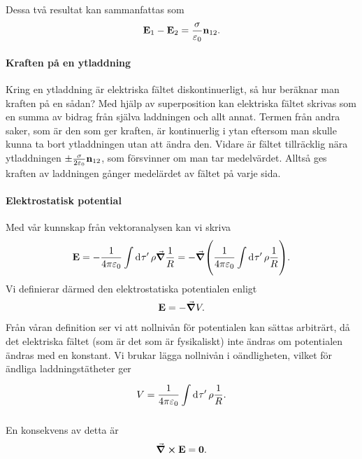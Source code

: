 Dessa två resultat kan sammanfattas som
\begin{align*}
	\vb{E}_{1} - \vb{E}_{2} = \frac{\sigma}{\varepsilon_{0}}\vb{n}_{12}.
\end{align*}

\paragraph{Kraften på en ytladdning}
Kring en ytladdning är elektriska fältet diskontinuerligt, så hur beräknar man kraften på en sådan? Med hjälp av superposition kan elektriska fältet skrivas som en summa av bidrag från själva laddningen och allt annat. Termen från andra saker, som är den som ger kraften, är kontinuerlig i ytan eftersom man skulle kunna ta bort ytladdningen utan att ändra den. Vidare är fältet tillräcklig nära ytladdningen $\pm\frac{\sigma}{2\varepsilon_{0}}\vb{n}_{12}$, som försvinner om man tar medelvärdet. Alltså ges kraften av laddningen gånger medelärdet av fältet på varje sida.

\paragraph{Elektrostatisk potential}
Med vår kunnskap från vektoranalysen kan vi skriva
\begin{align*}
	\vb{E} = -\frac{1}{4\pi\varepsilon_{0}}\int\limits_{}^{}\dd[]{\tau'}\rho\grad{\frac{1}{R}} = -\grad(\frac{1}{4\pi\varepsilon_{0}}\int\limits_{}^{}\dd[]{\tau'}\rho\frac{1}{R}).
\end{align*}
Vi definierar därmed den elektrostatiska potentialen enligt
\begin{align*}
	\vb{E} = -\grad{V}.
\end{align*}
Från våran definition ser vi att nollnivån för potentialen kan sättas arbiträrt, då det elektriska fältet (som är det som är fysikaliskt) inte ändras om potentialen ändras med en konstant. Vi brukar lägga nollnivån i oändligheten, vilket för ändliga laddningstätheter ger
\begin{align*}
	V = \frac{1}{4\pi\varepsilon_{0}}\int\limits_{}^{}\dd[]{\tau'}\rho\frac{1}{R}.
\end{align*}

En konsekvens av detta är
\begin{align*}
	\curl{\vb{E}} = \vb{0}.
\end{align*}

